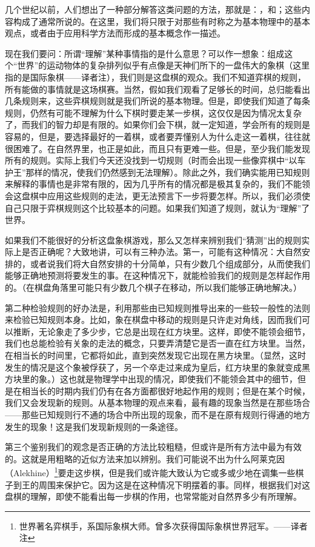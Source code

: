 几个世纪以前，人们想出了一种部分解答这类问题的方法，那就是：，和；这些内容构成了通常所说的。在这里，我们将只限于对那些有时称之为基本物理中的基本观点，或者由于应用科学方法而形成的基本概念作一描述。

现在我们要问：所谓“理解”某种事情指的是什么意思？可以作一想象：组成这个“世界”的运动物体的复杂排列似乎有点像是天神们所下的一盘伟大的象棋（这里指的是国际象棋——译者注），我们则是这盘棋的观众。我们不知道弈棋的规则，所有能做的事情就是这场棋赛。当然，假如我们观看了足够长的时间，总归能看出几条规则来，这些弈棋规则就是我们所说的基本物理。但是，即使我们知道了每条规则，仍然有可能不理解为什么下棋时要走某一步棋，这仅仅是因为情况太复杂了，而我们的智力却是有限的。如果你们会下棋，就一定知道，学会所有的规则是容易的，但是，要选择最好的一着棋，或者要弄懂别人为什么走这一着棋，往往就很困难了。在自然界里，也正是如此，而且只有更难一些。但是，至少我们能发现所有的规则。实际上我们今天还没找到一切规则（时而会出现一些像弈棋中“以车护王”那样的情况，使我们仍然感到无法理解）。除此之外，我们确实能用已知规则来解释的事情也是非常有限的，因为几乎所有的情况都是极其复杂的，我们不能领会这盘棋中应用这些规则的走法，更无法预言下一步将要怎样。所以，我们必须使自己只限于弈棋规则这个比较基本的问题。如果我们知道了规则，就认为“理解”了世界。

如果我们不能很好的分析这盘象棋游戏，那么又怎样来辨别我们“猜测”出的规则实际上是否正确呢？大致地讲，可以有三种办法。第一，可能有这种情况：大自然安排的，或者说我们将大自然安排的十分简单，只有少数几个组成部分，从而使我们能够正确地预测将要发生的事。在这种情况下，就能检验我们的规则是怎样起作用的。（在棋盘角落里可能只有少数几个棋子在移动，所以我们能够正确地解决。）

第二种检验规则的好办法是，利用那些由已知规则推导出来的一些较一般性的法则来检验已知规则本身。比如，象在棋盘中移动的规则是只许走对角线，因而我们可以推断，无论象走了多少步，它总是出现在红方块里。这样，即使不能领会细节，我们也总能检验有关象的走法的概念，只要弄清楚它是否一直在红方块里。当然，在相当长的时间里，它都将如此，直到突然发现它出现在黑方块里。（显然，这时发生的情况是这个象被俘获了，另一个卒走过来成为皇后，红方块里的象就变成黑方块里的象。）这也就是物理学中出现的情况，即使我们不能领会其中的细节，但是在相当长的时期内我们仍有在各方面都很好地起作用的规则；但是在某个时候，我们又会发现新的规则。从基本物理的观点来看，最有趣的现象当然是在那些场合——那些已知规则行不通的场合中所出现的现象，而不是在原有规则行得通的地方发生的现象！这是我们发现新规则的一条途径。

第三个鉴别我们的观念是否正确的方法比较粗糙，但或许是所有方法中最为有效的。这就是用粗略的近似方法来加以辨别。我们可能说不出为什么阿莱克因（Alekhine）\footnote{世界著名弈棋手，系国际象棋大师。曾多次获得国际象棋世界冠军。——译者注}要走这步棋，但是我们或许能大致认为它或多或少地在调集一些棋子到王的周围来保护它。因为这是在这种情况下明摆着的事。同样，根据我们对这盘棋的理解，即使不能看出每一步棋的作用，也常常能对自然界多少有所理解。

